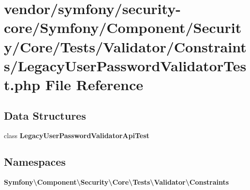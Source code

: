 \section{vendor/symfony/security-\/core/\+Symfony/\+Component/\+Security/\+Core/\+Tests/\+Validator/\+Constraints/\+Legacy\+User\+Password\+Validator\+Test.php File Reference}
\label{_legacy_user_password_validator_test_8php}
\subsection*{Data Structures}
\begin{DoxyCompactItemize}
\item 
class {\bf Legacy\+User\+Password\+Validator\+Api\+Test}
\end{DoxyCompactItemize}
\subsection*{Namespaces}
\begin{DoxyCompactItemize}
\item 
 {\bf Symfony\textbackslash{}\+Component\textbackslash{}\+Security\textbackslash{}\+Core\textbackslash{}\+Tests\textbackslash{}\+Validator\textbackslash{}\+Constraints}
\end{DoxyCompactItemize}

